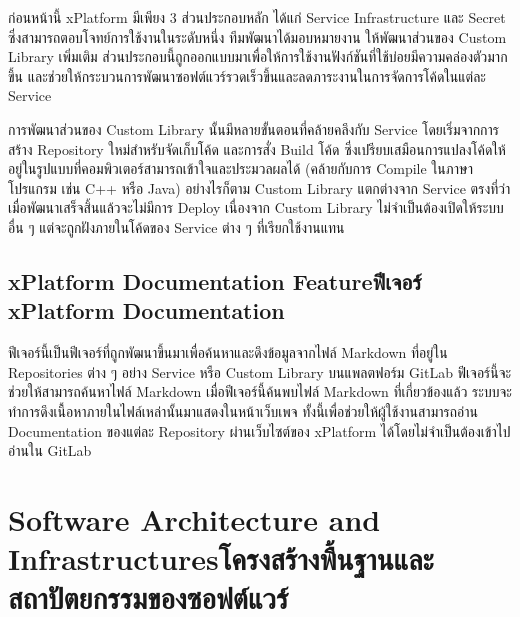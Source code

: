 ก่อนหน้านี้ xPlatform มีเพียง 3 ส่วนประกอบหลัก ได้แก่ Service Infrastructure และ Secret ซึ่งสามารถตอบโจทย์การใช้งานในระดับหนึ่ง ทีมพัฒนาได้มอบหมายงาน  ให้พัฒนาส่วนของ Custom Library เพิ่มเติม ส่วนประกอบนี้ถูกออกแบบมาเพื่อให้การใช้งานฟังก์ชันที่ใช้บ่อยมีความคล่องตัวมากขึ้น และช่วยให้กระบวนการพัฒนาซอฟต์แวร์รวดเร็วขึ้นและลดภาระงานในการจัดการโค้ดในแต่ละ Service

การพัฒนาส่วนของ Custom Library นั้นมีหลายขั้นตอนที่คล้ายคลึงกับ Service โดยเริ่มจากการสร้าง Repository ใหม่สำหรับจัดเก็บโค้ด และการสั่ง Build โค้ด ซึ่งเปรียบเสมือนการแปลงโค้ดให้อยู่ในรูปแบบที่คอมพิวเตอร์สามารถเข้าใจและประมวลผลได้ (คล้ายกับการ Compile ในภาษาโปรแกรม เช่น C++ หรือ Java) อย่างไรก็ตาม Custom Library แตกต่างจาก Service ตรงที่ว่าเมื่อพัฒนาเสร็จสิ้นแล้วจะไม่มีการ Deploy เนื่องจาก Custom Library ไม่จำเป็นต้องเปิดให้ระบบอื่น ๆ แต่จะถูกฝังภายในโค้ดของ Service ต่าง ๆ ที่เรียกใช้งานแทน

\subsection{\ifenglish xPlatform Documentation Feature\else ฟีเจอร์ xPlatform Documentation \fi}
ฟีเจอร์นี้เป็นฟีเจอร์ที่ถูกพัฒนาขึ้นมาเพื่อค้นหาและดึงข้อมูลจากไฟล์ Markdown ที่อยู่ใน Repositories ต่าง ๆ อย่าง  Service หรือ Custom Library บนแพลตฟอร์ม GitLab ฟีเจอร์นี้จะช่วยให้สามารถค้นหาไฟล์ Markdown เมื่อฟีเจอร์นี้ค้นพบไฟล์ Markdown ที่เกี่ยวข้องแล้ว ระบบจะทำการดึงเนื้อหาภายในไฟล์เหล่านั้นมาแสดงในหน้าเว็บเพจ ทั้งนี้เพื่อช่วยให้ผู้ใช้งานสามารถอ่าน Documentation ของแต่ละ Repository ผ่านเว็บไซต์ของ xPlatform ได้โดยไม่จำเป็นต้องเข้าไปอ่านใน GitLab

\section{\ifenglish Software Architecture and Infrastructures\else โครงสร้างพื้นฐานและสถาปัตยกรรมของซอฟต์แวร์ \fi}
